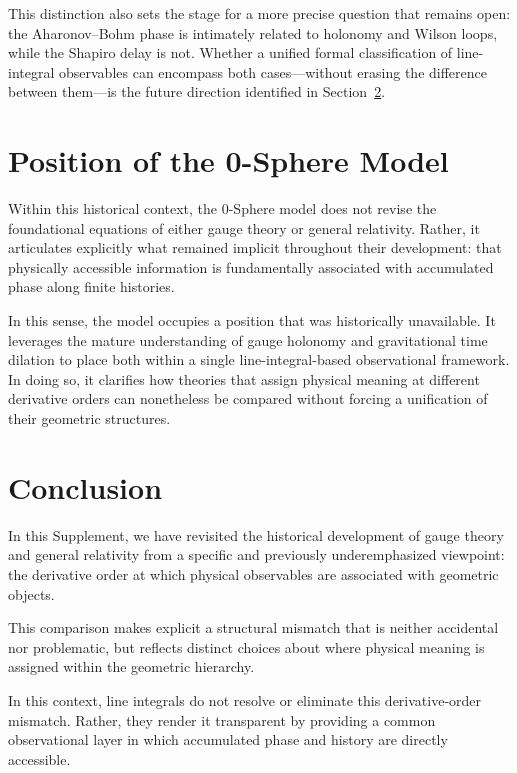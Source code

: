 \documentclass[12pt,letterpaper]{article}
\begin{document}
This distinction also sets the stage for a more precise question that remains open: the Aharonov--Bohm phase is intimately related to holonomy and Wilson loops, while the Shapiro delay is not. Whether a unified formal classification of line-integral observables can encompass both cases---without erasing the difference between them---is the future direction identified in Section~\ref{sec:conclusion}.

\section{Position of the 0-Sphere Model}

\justifying
Within this historical context, the 0-Sphere model does not revise the foundational equations of either gauge theory or general relativity. Rather, it articulates explicitly what remained implicit throughout their development: that physically accessible information is fundamentally associated with accumulated phase along finite histories.

In this sense, the model occupies a position that was historically unavailable. It leverages the mature understanding of gauge holonomy and gravitational time dilation to place both within a single line-integral-based observational framework. In doing so, it clarifies how theories that assign physical meaning at different derivative orders can nonetheless be compared without forcing a unification of their geometric structures.

\section{Conclusion}
\label{sec:conclusion}

\justifying
In this Supplement, we have revisited the historical development of gauge theory and general relativity from a specific and previously underemphasized viewpoint: the derivative order at which physical observables are associated with geometric objects.

This comparison makes explicit a structural mismatch that is neither accidental nor problematic, but reflects distinct choices about where physical meaning is assigned within the geometric hierarchy.

In this context, line integrals do not resolve or eliminate this derivative-order mismatch. Rather, they render it transparent by providing a common observational layer in which accumulated phase and history are directly accessible.
\end{document}
